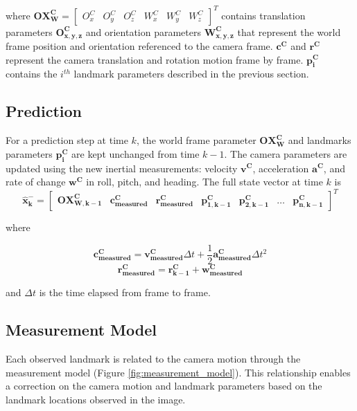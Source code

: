 \noindent where $\boldsymbol{OX_{W}^{C}}= \begin{bmatrix}O_{x}^{C} &
  O_{y}^{C} & O_{z}^{C} & W_{x}^{C} & W_{y}^{C} &
  W_{z}^{C} \end{bmatrix}^{T}$ contains translation parameters
$\boldsymbol{O_{x,y,z}^{C}}$ and orientation parameters
$\boldsymbol{W_{x,y,z}^{C}}$ that represent the world frame position and
orientation referenced to the camera frame.
$\boldsymbol{c^{C}}$ and $\boldsymbol{r^{C}}$ represent the camera
translation and rotation motion frame by frame. $\boldsymbol{p_{i}^{C}}$
contains the $i^{th}$ landmark parameters described in the previous section.

\subsection{Prediction}\label{sec:prediction}

For a prediction step at time $k$, the world frame parameter
$\boldsymbol{OX_W^C}$ and landmarks parameters $\boldsymbol{p_i^C}$
are kept unchanged from time $k-1$. The camera parameters are updated
using the new inertial measurements: velocity $\boldsymbol{v^{C}}$,
acceleration $\boldsymbol{a^{C}}$, and rate of change
$\boldsymbol{w^{C}}$ in roll, pitch, and heading. The full state
vector at time $k$ is
\begin{equation}
\boldsymbol{\hat{x}_{k}^-}
=\begin{bmatrix}
\boldsymbol{OX_{W,k-1}^{C}} & 
\boldsymbol{c_{measured}^{C}} &
\boldsymbol{r_{measured}^{C}} & 
\boldsymbol{p_{1,k-1}^{C}} & 
\boldsymbol{p_{2,k-1}^{C}} & 
\ldots & 
\boldsymbol{p_{n,k-1}^C}
\end{bmatrix}^T
\end{equation}

\noindent where 

$$\boldsymbol{c_{measured}^{C}}=\boldsymbol{v_{measured}^{C}}\Delta t+ 
\frac{1}{2}\boldsymbol{a_{measured}^{C}}\Delta t^{2}$$
$$\boldsymbol{r_{measured}^{C}}=\boldsymbol{r_{k-1}^{C}}+ \boldsymbol{w_{measured}^{C}}$$

\noindent and $\Delta t$ is the time elapsed from frame to frame. 

\subsection{Measurement Model}\label{sec:measurement_model}

Each observed landmark is related to the camera motion through the
measurement model (Figure \ref{fig:measurement_model}). This
relationship enables a correction on the camera motion and landmark
parameters based on the landmark locations observed in the image.

